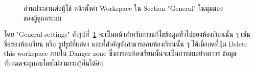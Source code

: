\documentclass[12pt,one side,openright,a4paper]{cpe-thesis-th}
\newcommand{\thaijustify}[1]{%
  \par\hspace{30pt}\justifying
  #1
}
\begin{document}
                \begin{figure}[H]
                    \centering
                    \caption[ส่วนประสานต่อผู้ใช้ หน้าตั้งค่า Workspace ของผู้ดูเเลระบบ (ใน "General")]{ส่วนประสานต่อผู้ใช้ หน้าตั้งค่า Workspace ใน Section "General" ในมุมมองของผู้ดูเเลระบบ}
                    \label{fig:new-ui-setting-general}
                \end{figure}
                \thaijustify{
                    โดย "General settings" ดังรูปที่~\ref{fig:new-ui-setting-general} จะเป็นหน้าสำหรับการแก้ไขข้อมูลทั่วไปของห้องเรียนนั้น ๆ เช่น ชื่อของห้องเรียน หรือ รูปรูปที่แสดง และที่สำคัญยังสามารถลบห้องเรียนนั้น ๆ ได้เมื่อกดที่ปุ่ม Delete this workspace ภายใน Danger zone ซึ่งการลบห้องเรียนนั้นจะเป็นการลบอย่างถาวร ข้อมูลทั้งหมดจะถูกลบโดยไม่สามารถกู้คืนได้อีก 
                }
            
\end{document}
